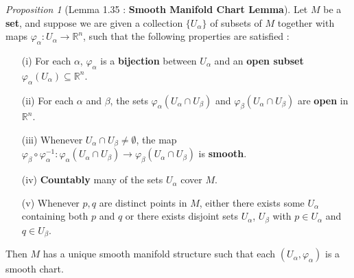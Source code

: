 \documentclass[a4paper]{article}
\theoremstyle{remark}
\newtheorem{prop}{Proposition}
\newcommand{\rn}{\mathbb{R}^n} %
\newcommand{\subhim}{\subseteq} %
\newcommand{\Ualpha}{U_{\alpha}} %
\newcommand{\Ubeta}{U_{\beta}} %
\newcommand{\alfa}{\alpha}  %
\begin{document}
\begin{prop}[Lemma 1.35 : \textbf{Smooth Manifold Chart Lemma}]
Let $M$ be a \textbf{set}, and suppose we are given a collection $\{U_{\alpha}\}$ of subsets of $M$ together with maps $\varphi_{\alpha} : U_{\alpha} \to \rn$, such that the following properties are satisfied :
\begin{enumerate}[nolistsep]
\item[(i)] For each $\alpha$, $\varphi_{\alpha}$ is a \textbf{bijection} between $U_{\alpha}$ and an \textbf{open subset} $\varphi_{\alpha}(U_{\alpha}) \subhim \rn$. 
\item[(ii)] For each $\alpha$ and $\beta$, the sets $\varphi_{\alpha}(U_{\alpha} \cap U_{\beta})$ and $\varphi_{\beta}(U_{\alpha} \cap U_{\beta})$ are \textbf{open} in $\rn$.
\item[(iii)] Whenever $\Ualpha \cap \Ubeta \neq \emptyset$, the map $\varphi_{\beta} \circ \varphi_{\alpha}^{-1} : \varphi_{\alfa}(\Ualpha \cap \Ubeta) \to \varphi_{\beta} (U_{\alfa}\cap \Ubeta)$ is \textbf{smooth}.
\item[(iv)] \textbf{Countably} many of the sets $\Ualpha$ cover $M$.  
\item[(v)] Whenever $p,q$ are distinct points in $M$, either there exists some $\Ualpha$ containing both $p$ and $q$ or there exists disjoint sets $U_{\alfa}$, $\Ubeta$ with $p \in \Ualpha$ and $q \in \Ubeta$.
\end{enumerate}
Then $M$ has a unique smooth manifold structure such that each $(\Ualpha, \varphi_{\alpha})$ is a smooth chart.
\end{prop}
\end{document}
